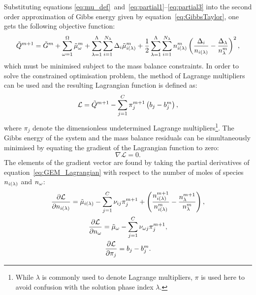 Substituting equations \eqref{eq:mu_def}~and~\eqref{eq:partial1}--\eqref{eq:partial3} into the second order approximation of Gibbs energy given by equation~\eqref{eq:GibbsTaylor}, one gets the following objective function:
\begin{equation}
  \tilde{Q}^{m+1} = \tilde{G}^{m} + \sum_{\omega=1}^{\Omega} \tilde{\mu}_{\omega}^m
                  + \sum_{\lambda=1}^{\Lambda} \sum_{i = 1}^{N_{\lambda}} \Delta_i \tilde{\mu}_{i(\lambda)}^m
                  + \frac{1}{2} \sum_{\lambda=1}^{\Lambda} \sum_{i = 1}^{N_{\lambda}} n_{i(\lambda)}^m \left(\frac{\Delta_i}{n_{i(\lambda)}} - \frac{\Delta_\lambda}{n_\lambda^m} \right)^2,
\end{equation}
which must be minimised subject to the mass balance constraints. In order to solve the constrained optimisation problem, the method of Lagrange multipliers can be used and the resulting Lagrangian function is defined as:
  \begin{equation}\label{eq:GEM_Lagrangian}
      \mathcal{L} = \tilde{Q}^{m+1} - \sum_{j = 1}^{C} \pi_{j}^{m+1} \left(b_{j} - b_{j}^m\right),
  \end{equation}
where $\pi_{j}$ denote the dimensionless undetermined Lagrange multipliers\footnote{While $\lambda$ is commonly used to denote Lagrange multipliers, $\pi$ is used here to avoid confusion with the solution phase index $\lambda$.}. The Gibbs energy of the system and the mass balance residuals can be simultaneously minimised by equating the gradient of the Lagrangian function to zero:
\begin{equation}
  \nabla \mathcal{L} = 0.
\end{equation}
The elements of the gradient vector are found by taking the partial derivatives of  equation~\eqref{eq:GEM_Lagrangian} with respect to the number of moles of species $n_{i(\lambda)}$ and $n_\omega$:
\begin{gather}
  \frac{\partial \mathcal{L}}{\partial n_{i(\lambda)}} = \tilde{\mu}_{i(\lambda)} - \sum_{j = 1}^{C} \nu_{ij} \pi_j^{m+1} + \left(\frac{n_{i(\lambda)}^{m+1}}{n_{i(\lambda)}^{m}} - \frac{n_\lambda^{m+1}}{n_\lambda^{m}} \right), \label{eq:pderL1}\\
  \frac{\partial \mathcal{L}}{\partial n_\omega} = \tilde{\mu}_{\omega} - \sum_{j = 1}^{C} \nu_{\omega j} \pi_{j}^{m+1},\\
  \frac{\partial \mathcal{L}}{\partial \pi_j} = b_{j} - b_{j}^m.
\end{gather}


